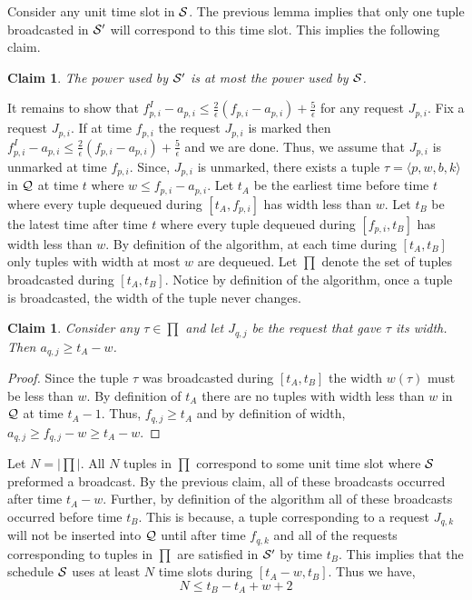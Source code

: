 \documentclass[11pt]{article}
\newtheorem{claim}[lemma]{Claim}
\newcommand{\eps}{\epsilon}
\newcommand{\cS}{{\cal S}}
\newcommand{\cQ}{{\cal Q}}
\begin{document}
Consider any unit time slot in $\cS$.  The previous lemma implies that only one tuple broadcasted in $\cS'$ will correspond to this time slot.  This implies the following claim.

\begin{claim}\label{clm:power}
The power used by $\cS'$ is at most the power used by $\cS$.
\end{claim}

It remains to show that $f^I_{p,i} - a_{p,i} \leq \frac{2}{\eps}(f_{p,i} - a_{p,i})+ \frac{5}{\eps}$ for any request $J_{p,i}$. Fix a request $J_{p,i}$.  If at time $f_{p,i}$ the request $J_{p,i}$ is marked then $f^I_{p,i} - a_{p,i} \leq  \frac{2}{\eps}(f_{p,i} - a_{p,i})+ \frac{5}{\eps}$ and we are done. Thus, we assume that $J_{p,i}$ is unmarked at time $f_{p,i}$.  Since, $J_{p,i}$ is unmarked, there exists a tuple $\tau = \langle p, w, b, k \rangle$ in $\cQ$ at time $t$ where $w \leq f_{p,i}  - a_{p,i}$.  Let $t_A$ be the earliest time before time $t$ where every tuple  dequeued during $[t_A,f_{p,i}]$ has width less than $w$.  Let $t_B$ be the latest time after time $t$ where every tuple dequeued during $[f_{p,i}, t_B]$ has width less than $w$. By definition of the algorithm, at each time during $[t_A,t_B]$ only tuples with width at most  $w$ are dequeued.  Let $\prod$ denote the set of tuples broadcasted during $[t_A,t_B]$.  Notice by definition of the algorithm,  once a tuple is broadcasted, the width of the tuple never changes.


\begin{claim}\label{clm1}
Consider any $\tau \in \prod$ and let $J_{q,j}$ be the request that gave $\tau$ its width.  Then $a_{q,j} \geq t_A - w$.
\end{claim}
\begin{proof}
Since the tuple $\tau$ was broadcasted during $[t_A,t_B]$ the width $w(\tau)$ must be less than $w$.   By definition of $t_A$ there are no tuples with width less than $w$ in $\cQ$ at time $t_A-1$.  Thus, $f_{q,j} \geq t_A$ and by definition of width, $a_{q,j}  \geq f_{q,j} - w \geq t_A - w$.
\end{proof}


Let $N = |\prod|$.  All $N$  tuples in $\prod$ correspond to some unit time slot where $\cS$ preformed a broadcast.  By the previous claim, all of these broadcasts occurred after time $t_A - w$. Further,  by definition of the algorithm all of these broadcasts occurred before time $t_B$.  This is because, a tuple corresponding to a request $J_{q,k}$ will not be inserted into $\cQ$ until after time $f_{q,k}$ and all of the requests corresponding to tuples in $\prod$ are satisfied in $\cS'$ by time $t_B$.  This implies that the schedule $\cS$ uses at least $N$ time slots during $[t_A - w, t_B]$. Thus we have,  $$N \leq t_B - t_A + w+2$$
\end{document}
